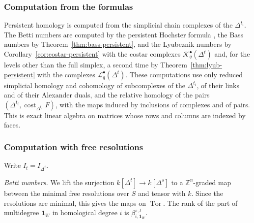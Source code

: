 \documentclass[11pt]{article}
\theoremstyle{plain}
\theoremstyle{definition}
\begin{document}
\subsubsection*{Computation from the formulas}
Persistent homology is computed from the simplicial chain complexes of the $\Delta^{t_i}$. The Betti numbers are computed by the persistent Hochster formula \cite[Theorem~3.2]{SuwayyidWeiGraphs}, the Bass numbers by Theorem~\ref{thm:bass-persistent}, and the Lyubeznik numbers by Corollary~\ref{cor:costar-persistent} with the costar complexes $\mathcal K^\bullet_q(\Delta^t)$ and, for the levels other than the full simplex, a second time by Theorem~\ref{thm:lyub-persistent} with the complexes $\mathcal L^\bullet_q(\Delta^t)$. These computations use only reduced simplicial homology and cohomology of subcomplexes of the $\Delta^{t_i}$, of their links and of their Alexander duals, and the relative homology of the pairs $(\Delta^{t_i},\operatorname{cost}_{\Delta^{t_i}}F)$, with the maps induced by inclusions of complexes and of pairs. This is exact linear algebra on matrices whose rows and columns are indexed by faces.

\subsubsection*{Computation with free resolutions}
Write $I_t=I_{\Delta^t}$.

\emph{Betti numbers.} We lift the surjection $k[\Delta^t]\to k[\Delta^s]$ to a $\mathbb{Z}^n$-graded map between the minimal free resolutions over $S$ and tensor with $k$. Since the resolutions are minimal, this gives the maps on $\operatorname{Tor}$. The rank of the part of multidegree $\mathbf 1_W$ in homological degree $i$ is $\beta^{s,t}_{i,\mathbf 1_W}$.
\end{document}
